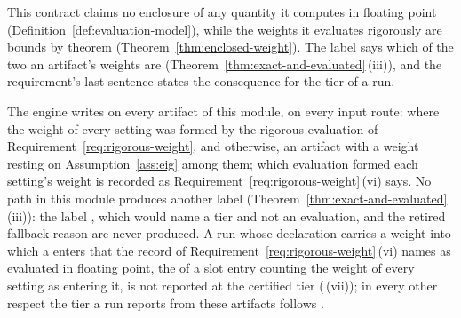 
This contract claims no enclosure of any quantity it computes in floating
point (Definition~\ref{def:evaluation-model}), while the weights it evaluates
rigorously are bounds by theorem (Theorem~\ref{thm:enclosed-weight}). The label
says which of the two an artifact's weights are
(Theorem~\ref{thm:exact-and-evaluated}\,(iii)), and the requirement's last
sentence states the consequence for the tier of a run.

\begin{requirement}\label{req:evaluation-label}
The engine writes  on every artifact of this module,
on every input route:  where the weight of every setting was
formed by the rigorous evaluation of Requirement~\ref{req:rigorous-weight},
and  otherwise, an artifact with a weight resting on
Assumption~\ref{ass:eig} among them; which evaluation formed each setting's
weight is recorded as Requirement~\ref{req:rigorous-weight}\,(vi) says. No
path in this module produces another label
(Theorem~\ref{thm:exact-and-evaluated}\,(iii)): the label ,
which would name a tier and not an evaluation, and the retired fallback reason
 are never produced. A run whose
declaration carries a weight into which a  enters
that the record of Requirement~\ref{req:rigorous-weight}\,(vi) names as
evaluated in floating point, the
 of a slot entry counting
the weight of every setting as entering it, is not reported at the certified
tier
(\,(vii)); in every other
respect the tier a run reports from these artifacts follows
.
\end{requirement}
